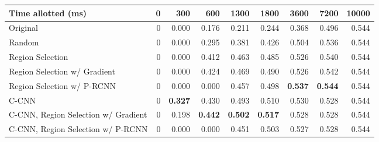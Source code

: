 \begin{tabular}{lrrrrrrrr}
\toprule
Time allotted (ms)                  & 0 & 300            & 600            & 1300           & 1800           & 3600           & 7200           & 10000 \\
\midrule
Original                            & 0 & 0.000          & 0.176          & 0.211          & 0.244          & 0.368          & 0.496          & 0.544 \\
Random                              & 0 & 0.000          & 0.295          & 0.381          & 0.426          & 0.504          & 0.536          & 0.544 \\
Region Selection                    & 0 & 0.000          & 0.412          & 0.463          & 0.485          & 0.526          & 0.540          & 0.544 \\
Region Selection w/ Gradient        & 0 & 0.000          & 0.424          & 0.469          & 0.490          & 0.526          & 0.542          & 0.544 \\
Region Selection w/ P-RCNN          & 0 & 0.000          & 0.000          & 0.457          & 0.498          & \textbf{0.537} & \textbf{0.544} & 0.544 \\
C-CNN                               & 0 & \textbf{0.327} & 0.430          & 0.493          & 0.510          & 0.530          & 0.528          & 0.544 \\
C-CNN, Region Selection w/ Gradient & 0 & 0.198          & \textbf{0.442} & \textbf{0.502} & \textbf{0.517} & 0.528          & 0.528          & 0.544 \\
C-CNN, Region Selection w/ P-RCNN   & 0 & 0.000          & 0.000          & 0.451          & 0.503          & 0.527          & 0.528          & 0.544 \\
\bottomrule
\end{tabular}
